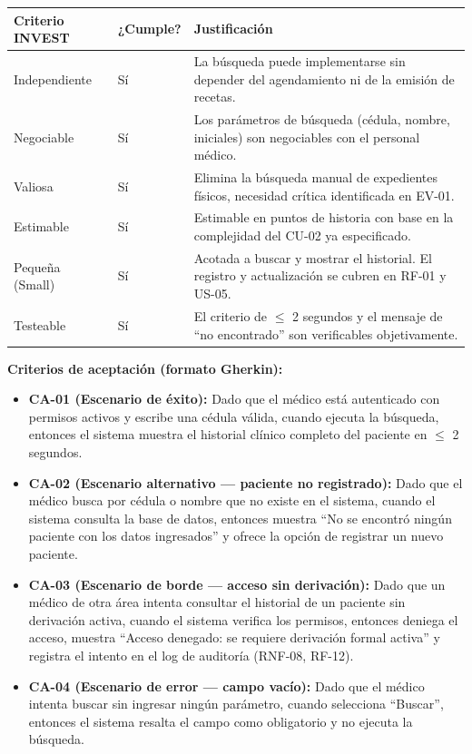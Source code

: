 \documentclass[11pt,a4paper]{article}
\providecommand{\tightlist}{%
	\setlength{\itemsep}{0pt}\setlength{\parskip}{0pt}}
\begin{document}
	\begin{longtable}{p{} p{} p{}}
		
		
		\toprule
		\textbf{Criterio INVEST} &
		\textbf{¿Cumple?} &
		\textbf{Justificación} \\
		\midrule
		\endhead
		
		Independiente & Sí & La búsqueda puede implementarse sin depender del agendamiento ni de la emisión de recetas. \\
		Negociable & Sí & Los parámetros de búsqueda (cédula, nombre, iniciales) son negociables con el personal médico. \\
		Valiosa & Sí & Elimina la búsqueda manual de expedientes físicos, necesidad crítica identificada en EV-01. \\
		Estimable & Sí & Estimable en puntos de historia con base en la complejidad del CU-02 ya especificado. \\
		Pequeña (Small) & Sí & Acotada a buscar y mostrar el historial. El registro y actualización se cubren en RF-01 y US-05. \\
		Testeable & Sí & El criterio de \(\leq\) 2 segundos y el mensaje de ``no encontrado'' son verificables objetivamente. \\
		\bottomrule
		
	\end{longtable}
	
	\textbf{Criterios de aceptación (formato Gherkin):}
	
	\begin{itemize}
		\tightlist
		\item
		\textbf{CA-01 (Escenario de éxito):} Dado que el médico está autenticado con permisos activos y escribe una cédula válida, cuando ejecuta la búsqueda, entonces el sistema muestra el historial clínico completo del paciente en \(\leq\) 2 segundos.
		\item
		\textbf{CA-02 (Escenario alternativo --- paciente no registrado):} Dado que el médico busca por cédula o nombre que no existe en el sistema, cuando el sistema consulta la base de datos, entonces muestra ``No se encontró ningún paciente con los datos ingresados'' y ofrece la opción de registrar un nuevo paciente.
		\item
		\textbf{CA-03 (Escenario de borde --- acceso sin derivación):} Dado que un médico de otra área intenta consultar el historial de un paciente sin derivación activa, cuando el sistema verifica los permisos, entonces deniega el acceso, muestra ``Acceso denegado: se requiere derivación formal activa'' y registra el intento en el log de auditoría (RNF-08, RF-12).
		\item
		\textbf{CA-04 (Escenario de error --- campo vacío):} Dado que el médico intenta buscar sin ingresar ningún parámetro, cuando selecciona ``Buscar'', entonces el sistema resalta el campo como obligatorio y no ejecuta la búsqueda.
	\end{itemize}
	
\end{document}
